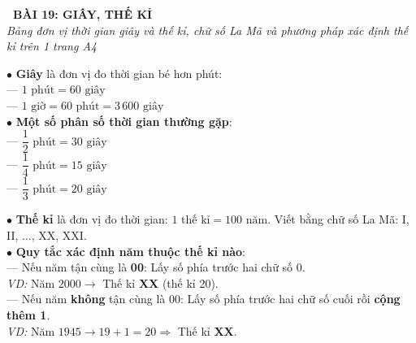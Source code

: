 \documentclass[14pt,a4paper,oneside]{extbook}
\begin{document}
\noindent
\begin{tcolorbox}[
  enhanced,
  colback=teal!8!white,
  colframe=teal!80!black,
  arc=3mm, boxrule=1pt,
  left=3mm, right=3mm, top=2mm, bottom=2mm,
  halign=center
]
  {\Large\bfseries\color{teal!90!black}\faBookmark\ BÀI 19: GIÂY, THẾ KỈ}\\[1.5pt]
  {\footnotesize\itshape\color{black!75} Bảng đơn vị thời gian giây và thế kỉ, chữ số La Mã và phương pháp xác định thế kỉ trên 1 trang A4}
\end{tcolorbox}

\vspace{2mm}

\noindent
\begin{minipage}[t]{0.49\textwidth}
  \begin{tcolorbox}[
    enhanced,
    title={\footnotesize\bfseries\color{white}\faClockO\ 1. Đơn vị Giây \& Đổi thời gian},
    colback=blue!2!white,
    colframe=blue!75!black,
    arc=2.5mm, boxrule=0.8pt, top=1.8mm, bottom=1.8mm, left=2mm, right=2mm
  ]
    \footnotesize
    $\bullet$ \textbf{Giây} là đơn vị đo thời gian bé hơn phút:\\
    --- $1\text{ phút} = 60\text{ giây}$\\
    --- $1\text{ giờ} = 60\text{ phút} = 3\,600\text{ giây}$\\
    $\bullet$ \textbf{Một số phân số thời gian thường gặp}:\\
    --- $\dfrac{1}{2}\text{ phút} = 30\text{ giây}$\\
    --- $\dfrac{1}{4}\text{ phút} = 15\text{ giây}$\\
    --- $\dfrac{1}{3}\text{ phút} = 20\text{ giây}$
  \end{tcolorbox}
\end{minipage}%
\hfill
\begin{minipage}[t]{0.49\textwidth}
  \begin{tcolorbox}[
    enhanced,
    title={\footnotesize\bfseries\color{white}\faHistory\ 2. Thế kỉ \& Cách xác định thế kỉ},
    colback=teal!2!white,
    colframe=teal!75!black,
    arc=2.5mm, boxrule=0.8pt, top=1.8mm, bottom=1.8mm, left=2mm, right=2mm
  ]
    \footnotesize
    $\bullet$ \textbf{Thế kỉ} là đơn vị đo thời gian: $1\text{ thế kỉ} = 100\text{ năm}$. Viết bằng chữ số La Mã: I, II, ..., XX, XXI.\\
    $\bullet$ \textbf{Quy tắc xác định năm thuộc thế kỉ nào}:\\
    --- Nếu năm tận cùng là \textbf{00}: Lấy số phía trước hai chữ số 0.\\
    \textit{VD:} Năm $2000 \rightarrow$ Thế kỉ \textbf{XX} (thế kỉ 20).\\
    --- Nếu năm \textbf{không} tận cùng là 00: Lấy số phía trước hai chữ số cuối rồi \textbf{cộng thêm 1}.\\
    \textit{VD:} Năm $1945 \rightarrow 19 + 1 = 20 \Rightarrow$ Thế kỉ \textbf{XX}.
  \end{tcolorbox}
\end{minipage}
\end{document}
